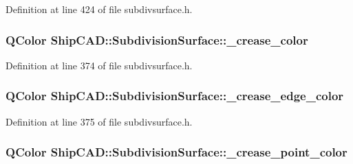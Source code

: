 Definition at line 424 of file subdivsurface.\-h.

\hypertarget{classShipCAD_1_1SubdivisionSurface_aaa3b772931e04f8650db2d005ae05d6a}{
\subsubsection[{\-\_\-crease\-\_\-color}]{\setlength{\rightskip}{0pt plus 5cm}Q\-Color Ship\-C\-A\-D\-::\-Subdivision\-Surface\-::\-\_\-crease\-\_\-color\hspace{0.3cm}{\ttfamily [protected]}}}\label{classShipCAD_1_1SubdivisionSurface_aaa3b772931e04f8650db2d005ae05d6a}


Definition at line 374 of file subdivsurface.\-h.

\hypertarget{classShipCAD_1_1SubdivisionSurface_a6106aee9d086aa377d9a3a6a6291b54c}{
\subsubsection[{\-\_\-crease\-\_\-edge\-\_\-color}]{\setlength{\rightskip}{0pt plus 5cm}Q\-Color Ship\-C\-A\-D\-::\-Subdivision\-Surface\-::\-\_\-crease\-\_\-edge\-\_\-color\hspace{0.3cm}{\ttfamily [protected]}}}\label{classShipCAD_1_1SubdivisionSurface_a6106aee9d086aa377d9a3a6a6291b54c}


Definition at line 375 of file subdivsurface.\-h.

\hypertarget{classShipCAD_1_1SubdivisionSurface_a9602182d9a123dc267d34a2cd1b45ed7}{
\subsubsection[{\-\_\-crease\-\_\-point\-\_\-color}]{\setlength{\rightskip}{0pt plus 5cm}Q\-Color Ship\-C\-A\-D\-::\-Subdivision\-Surface\-::\-\_\-crease\-\_\-point\-\_\-color\hspace{0.3cm}{\ttfamily [protected]}}}\label{classShipCAD_1_1SubdivisionSurface_a9602182d9a123dc267d34a2cd1b45ed7}


